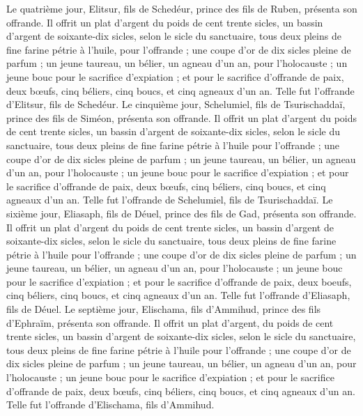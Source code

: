 \begin{multicols}{2}
Le quatrième jour, Elitsur, fils de Schedéur, prince des fils de Ruben, présenta son offrande.
Il offrit un plat d'argent du poids de cent trente sicles, un bassin d'argent de soixante-dix sicles, selon le sicle du sanctuaire, tous deux pleins de fine farine pétrie à l'huile, pour l'offrande ;
une coupe d'or de dix sicles pleine de parfum ;
un jeune taureau, un bélier, un agneau d'un an, pour l'holocauste ;
un jeune bouc pour le sacrifice d'expiation ;
et pour le sacrifice d'offrande de paix, deux bœufs, cinq béliers, cinq boucs, et cinq agneaux d'un an. Telle fut l'offrande d'Elitsur, fils de Schedéur.
Le cinquième jour, Schelumiel, fils de Tsurischaddaï, prince des fils de Siméon, présenta son offrande.
Il offrit un plat d'argent du poids de cent trente sicles, un bassin d'argent de soixante-dix sicles, selon le sicle du sanctuaire, tous deux pleins de fine farine pétrie à l'huile pour l'offrande ;
une coupe d'or de dix sicles pleine de parfum ;
un jeune taureau, un bélier, un agneau d'un an, pour l'holocauste ;
un jeune bouc pour le sacrifice d'expiation ;
et pour le sacrifice d'offrande de paix, deux bœufs, cinq béliers, cinq boucs, et cinq agneaux d'un an. Telle fut l'offrande de Schelumiel, fils de Tsurischaddaï.
Le sixième jour, Eliasaph, fils de Déuel, prince des fils de Gad, présenta son offrande.
Il offrit un plat d'argent du poids de cent trente sicles, un bassin d'argent de soixante-dix sicles, selon le sicle du sanctuaire, tous deux pleins de fine farine pétrie à l'huile pour l'offrande ;
une coupe d'or de dix sicles pleine de parfum ;
un jeune taureau, un bélier, un agneau d'un an, pour l'holocauste ;
un jeune bouc pour le sacrifice d'expiation ;
et pour le sacrifice d'offrande de paix, deux boeufs, cinq béliers, cinq boucs, et cinq agneaux d'un an. Telle fut l'offrande d'Eliasaph, fils de Déuel.
Le septième jour, Elischama, fils d'Ammihud, prince des fils d'Ephraïm, présenta son offrande.
Il offrit un plat d'argent, du poids de cent trente sicles, un bassin d'argent de soixante-dix sicles, selon le sicle du sanctuaire, tous deux pleins de fine farine pétrie à l'huile pour l'offrande ;
une coupe d'or de dix sicles pleine de parfum ;
un jeune taureau, un bélier, un agneau d'un an, pour l'holocauste ;
un jeune bouc pour le sacrifice d'expiation ;
et pour le sacrifice d'offrande de paix, deux bœufs, cinq béliers, cinq boucs, et cinq agneaux d'un an. Telle fut l'offrande d'Elischama, fils d'Ammihud.

\end{multicols}
